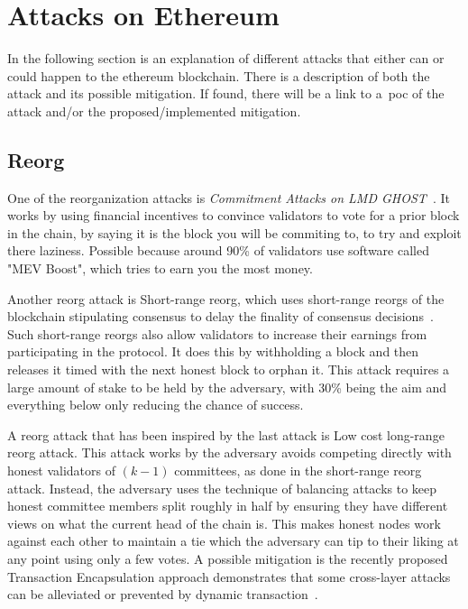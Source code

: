 
\section{Attacks on Ethereum}\label{sec:attacks-on-ethereum}
In the following section is an explanation of different attacks
that either can or could happen to the ethereum blockchain.
There is a description of both the attack and its possible mitigation.
If found, there will be a link to a~\gls{poc} of the attack and/or the proposed/implemented mitigation.
\subsection{Reorg}\label{subsec:reorg}
One of the reorganization attacks is \textit{Commitment Attacks on LMD GHOST}~\cite{sarenche2024breakingbalancepowercommitment}.
It works by using financial incentives to convince validators to vote for a prior block in the chain, by saying it is the block you will be commiting to, to try and exploit there laziness.
Possible because around 90\% of validators use software called "MEV Boost", which tries to earn you the most money.

Another reorg attack is Short-range reorg, which uses short-range reorgs of the blockchain stipulating consensus to delay the finality of consensus decisions~\cite{10.1007/978-3-031-18283-9_28}.
Such short-range reorgs also allow validators to increase their earnings from participating in the protocol.
It does this by withholding a block and then releases it timed with the next honest block to orphan it.
This attack requires a large amount of stake to be held by the adversary, with 30\% being the aim and everything below only reducing the chance of success.

A reorg attack that has been inspired by the last attack is Low cost long-range reorg attack\cite{10.1007/978-3-031-18283-9_28}.
This attack works by the adversary avoids competing directly with honest validators of $(k - 1)$ committees, as done in the short-range reorg attack.
Instead, the adversary uses the technique of balancing attacks to keep honest committee members split roughly in half by ensuring they have different views on what the current head of the chain is.
This makes honest nodes work against each other to maintain a tie which the adversary can tip to their liking at any point using only a few votes.
A possible mitigation is the recently proposed Transaction Encapsulation approach demonstrates that some cross-layer attacks can be alleviated or prevented by dynamic transaction~.

